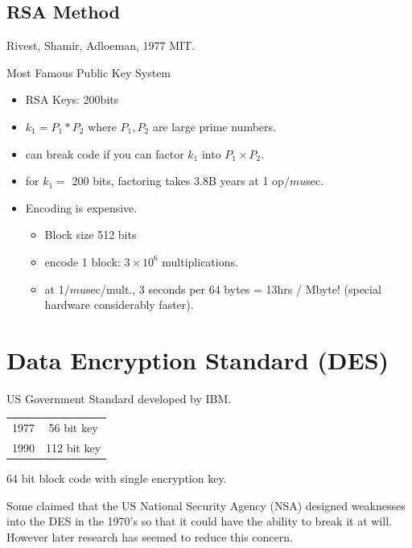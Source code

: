 \documentclass{article}	%
\begin{document}
\subsection{RSA Method}
Rivest, Shamir, Adloeman, 1977 MIT.

Most Famous Public Key System

\begin{itemize}
\item RSA Keys:  200bits
\item $k_1 = P_1 * P_2$ where $P_1, P_2$ are large prime numbers.
\item can break code if you can factor $k_1$ into $P_1 \times P_2$.
\item for $k_1 =$ 200 bits, factoring takes 3.8B years at 1 op$/mu$sec.
\item Encoding is expensive.
\begin{itemize}
	\item Block size 512 bits
        \item encode 1 block:  $3\times 10^6$ multiplications.
        \item at 1$/mu$sec/mult.,  3 seconds per 64 bytes = 13hrs / Mbyte!
        (special hardware considerably faster).
        \end{itemize}
\end{itemize}



\section{Data Encryption Standard (DES)}

US Government Standard developed by IBM.

\begin{tabular}{cc}
1977 &  56 bit key \\
1990 & 112 bit key \\
\end{tabular}

64 bit block code with single encryption key.

 Some claimed that the US National Security Agency (NSA) designed weaknesses into	%
the DES in the 1970's so that it could have the ability to break it at will.   However
later research has seemed to reduce this concern. 
\end{document}
